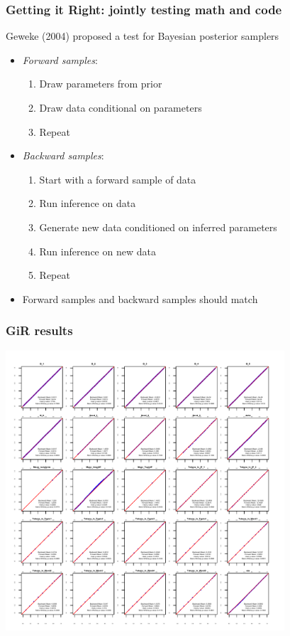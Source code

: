 \documentclass[10pt, xcolor=table]{beamer}
\theoremstyle{definition}
\theoremstyle{remark}
\begin{document}
\begin{frame} \frametitle{Getting it Right: jointly testing math and code}

Geweke (2004) proposed a test for Bayesian posterior samplers \vspace{.2cm}
\begin{itemize}
\item {\em Forward samples}: 
\begin{enumerate}
\item Draw parameters from prior
\item Draw data conditional on parameters
\item Repeat
\end{enumerate} \vspace{.2cm}
\item {\em Backward samples}: 
\begin{enumerate}
\item Start with a forward sample of data
\item Run inference on data
\item Generate new data conditioned on inferred parameters
\item Run inference on new data
\item Repeat
\end{enumerate} \vspace{.2cm}
\item Forward samples and backward samples should match
\end{itemize}


\end{frame}

\begin{frame} \frametitle{GiR results}
\begin{center}
\includegraphics[width=0.78\textwidth]{./figures/GiReta} 
\end{center}
\end{frame}
\end{document}
